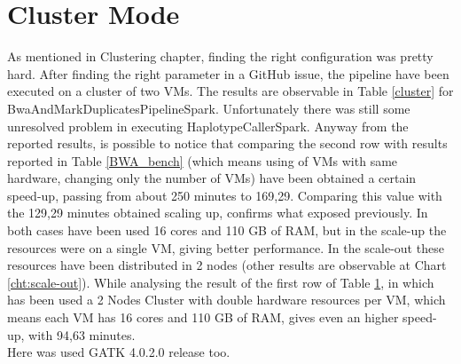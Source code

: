\section{Cluster Mode}
As mentioned in Clustering chapter, finding the right configuration was pretty hard. After finding the right parameter in a GitHub issue, the pipeline have been executed on a cluster of two VMs. The results are observable in Table \ref{cluster} for BwaAndMarkDuplicatesPipelineSpark. Unfortunately there was still some unresolved problem in executing HaplotypeCallerSpark.\newline
Anyway from the reported results, is possible to notice that comparing the second row with results reported in Table \ref{BWA_bench} (which means using of VMs with same hardware, changing only the number of VMs) have been obtained a certain speed-up, passing from about 250 minutes to 169,29. Comparing this value with the 129,29 minutes obtained scaling up, confirms what exposed previously. In both cases have been used 16 cores and 110 GB of RAM, but in the scale-up the resources were on a single VM, giving better performance. In the scale-out these resources have been distributed in 2 nodes (other results are observable at Chart \ref{cht:scale-out}).\newline
While analysing the result of the first row of Table \ref{}, in which has been used a 2 Nodes Cluster with double hardware resources per VM, which means each VM has 16 cores and 110 GB of RAM, gives even an higher speed-up, with 94,63 minutes.
\\[1\baselineskip]
Here was used GATK 4.0.2.0 release too.

